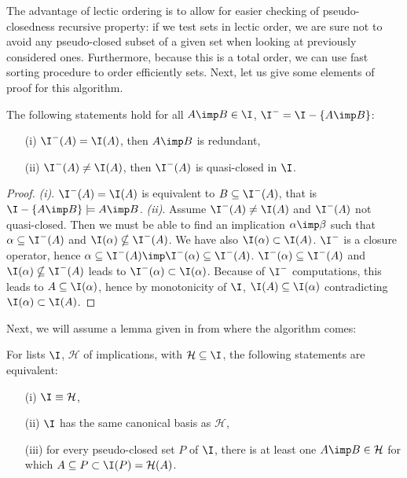 \begin{figure}[ht]
	
\end{figure}

\vspace{1.2em}

The advantage of lectic ordering is to allow for easier checking of pseudo-closedness recursive property: if we test sets in lectic order,
we are sure not to avoid any pseudo-closed subset of a given set when
looking at previously considered ones. Furthermore, because this is 
a total order, we can use fast sorting procedure to order 
efficiently sets. Next, let us give some elements of proof for this 
algorithm.


\begin{proposition} The following statements hold for all $A \imp B \in \I$, $\I^{-} = \I - \{ A \imp B \}$:
	\begin{itemize}
		\item[(i)] $\I^{-}(A) = \I(A)$, then $A \imp B$ is redundant,
		\item[(ii)] $\I^{-}(A) \neq \I(A)$, then $\I^{-}(A)$ is quasi-closed in $\I$.
	\end{itemize}
\end{proposition}

\begin{proof} \textit{(i)}. $\I^{-}(A) = \I(A)$ is equivalent to $B \subseteq \I^{-}(A)$, that is $\I - \{ A \imp B \} \models A \imp B$. \textit{(ii)}. Assume $\I^{-}(A) \neq \I(A)$ and $\I^{-}(A)$ not quasi-closed. Then we must be
able to find an implication $\alpha \imp \beta$ such that $\alpha \subseteq \I^{-}(A)$ and $ \I(\alpha) \nsubseteq \I^{-}(A)$. We have also $\I(\alpha) \subset \I(A)$. $\I^{-}$ is a closure operator, hence $\alpha \subseteq \I^{-}(A) \imp \I^{-}(\alpha) \subseteq \I^{-}(A)$. $\I^{-}(\alpha) \subseteq \I^{-}(A)$ and $ \I(\alpha) \nsubseteq \I^{-}(A)$ leads to $\I^{-}(\alpha) 
\subset \I(\alpha)$. Because of $\I^{-}$ computations, this leads to $A \subseteq \I(\alpha)$, hence by monotonicity of $\I$, $\I(A) \subseteq \I(\alpha)$ contradicting $\I(\alpha) \subset \I(A)$.

\end{proof}

Next, we will assume a lemma given in \cite{duquenne_variations_2007} from where
the algorithm comes:

\begin{lemma} For lists $\I$, $\mathcal{H}$ of implications, with $\mathcal{H} \subseteq \I$, the following statements are equivalent:
\begin{itemize}
	\item[(i)] $\I \equiv \mathcal{H}$,
	\item[(ii)] $\I$ has the same canonical basis as $\mathcal{H}$,
	\item[(iii)] for every pseudo-closed set $P$ of $\I$, there is at least
	one $A \imp B \in \mathcal{H}$ for which $A \subseteq P \subset \I(P) = \mathcal{H}(A)$.
\end{itemize}
\end{lemma}

